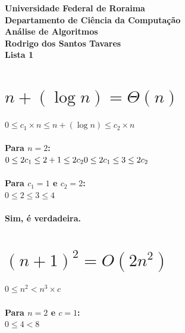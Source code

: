 \documentclass[answers]{exam}
\begin{document}
  \runningfooter{}{}{\thepage}
  \begin{center}
    \textbf{
      Universidade Federal de Roraima\\
      Departamento de Ci\^{e}ncia da Computa\c{c}\~{a}o\\
      An\'{a}lise de Algoritmos\\
      \vspace{12pt}
      Rodrigo dos Santos Tavares\\
      \vspace{12pt}
      \large{Lista 1}
    }
  \end{center}

  \begin{questions}
    \begin{parts}
        \part{$n + (\log{n}) = \Theta(n)$}
        \begin{solution}
            $0 \le c_1 \times n \le n + (\log{n}) \le c_2 \times n$\\
            \\
            \textbf{Para $n = 2$:}\\
            $0 \le 2c_1 \le 2+1 \le 2c_2\\
             0 \le 2c_1 \le 3 \le 2c_2$\\
            \\
            \textbf{Para $c_1=1$ e $c_2=2$:}\\
            $0 \le 2 \le 3 \le 4$\\
            \\
            \textbf{Sim, é verdadeira.}

        \end{solution}

        \part{${(n+1)}^{2} = O(2n^{2})$}
        \begin{solution}
            $0 \le n^2 < n^3 \times c$\\
            \\
            \textbf{Para $n = 2$ e $c=1$:}\\
            $0 \le 4 < 8$
        \end{solution}


\end{parts}
\end{questions}
\end{document}

